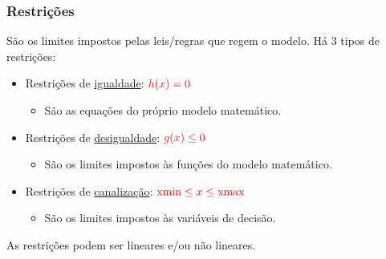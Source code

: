 \documentclass{beamer}
\begin{document}
\begin{frame}
	\frametitle{Restrições}
	São os \alert{limites} impostos pelas leis/regras que regem o modelo. Há 3 tipos de restrições:
	\begin{itemize}
	\item {Restrições de \underline{igualdade}: $\color{red} h(x) = 0$}
		\begin{itemize}
		\item[] São as equações do próprio modelo matemático.
		\end{itemize}
	\item {Restrições de \underline{desigualdade}: $\color{red} g(x) \le 0$}
		\begin{itemize}
		\item[] São os limites impostos às funções do modelo matemático.
		\end{itemize}
	\item {Restrições de \underline{canalização}: $\color{red} \text{xmin} \le x \le \text{xmax}$} 
		\begin{itemize}
		\item[] São os limites impostos às variáveis de decisão.
		\end{itemize}
	\end{itemize}
	As restrições podem ser \alert{lineares} e/ou \alert{não lineares}.
\end{frame}
\end{document}
